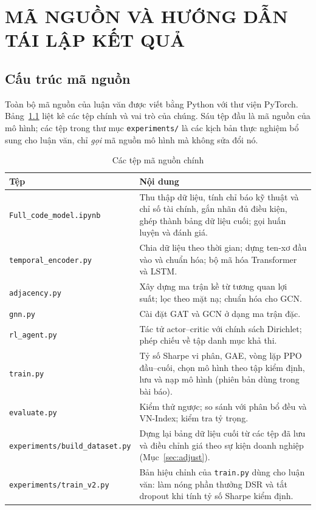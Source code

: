 \chapter{MÃ NGUỒN VÀ HƯỚNG DẪN TÁI LẬP KẾT QUẢ}
\label{app:code}

\section{Cấu trúc mã nguồn}

Toàn bộ mã nguồn của luận văn được viết bằng Python với thư viện PyTorch. Bảng~\ref{tab:files} liệt kê các tệp chính và vai trò của chúng. Sáu tệp đầu là mã nguồn của mô hình; các tệp trong thư mục \texttt{experiments/} là các kịch bản thực nghiệm bổ sung cho luận văn, chỉ \emph{gọi} mã nguồn mô hình mà không sửa đổi nó.

\begin{table}[ht]
\centering\footnotesize
\caption{Các tệp mã nguồn chính}
\label{tab:files}
\begin{tabularx}{\textwidth}{@{}p{6.6cm}X@{}}
\toprule
Tệp & Nội dung \\
\midrule
\texttt{Full\_code\_model.ipynb} & Thu thập dữ liệu, tính chỉ báo kỹ thuật và chỉ số tài chính, gắn nhãn đủ điều kiện, ghép thành bảng dữ liệu cuối; gọi huấn luyện và đánh giá. \\
\texttt{temporal\_encoder.py} & Chia dữ liệu theo thời gian; dựng ten-xơ đầu vào và chuẩn hóa; bộ mã hóa Transformer và LSTM. \\
\texttt{adjacency.py} & Xây dựng ma trận kề từ tương quan lợi suất; lọc theo mặt nạ; chuẩn hóa cho GCN. \\
\texttt{gnn.py} & Cài đặt GAT và GCN ở dạng ma trận đặc. \\
\texttt{rl\_agent.py} & Tác tử actor--critic với chính sách Dirichlet; phép chiếu về tập danh mục khả thi. \\
\texttt{train.py} & Tỷ số Sharpe vi phân, GAE, vòng lặp PPO đầu--cuối, chọn mô hình theo tập kiểm định, lưu và nạp mô hình (phiên bản dùng trong bài báo). \\
\texttt{evaluate.py} & Kiểm thử ngược; so sánh với phân bổ đều và VN-Index; kiểm tra tỷ trọng. \\
\midrule
\texttt{experiments/build\_dataset.py} & Dựng lại bảng dữ liệu cuối từ các tệp đã lưu và điều chỉnh giá theo sự kiện doanh nghiệp (Mục~\ref{sec:adjust}). \\
\texttt{experiments/train\_v2.py} & Bản hiệu chỉnh của \texttt{train.py} dùng cho luận văn: làm nóng phần thưởng DSR và tắt dropout khi tính tỷ số Sharpe kiểm định. \\

\end{tabularx}
\end{table}
